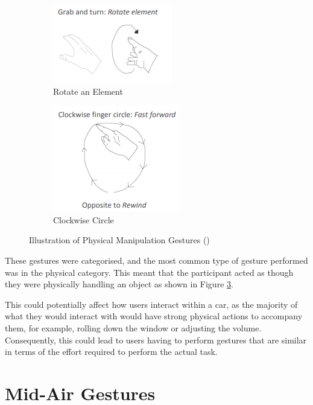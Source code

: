 \documentclass{l4proj}
\begin{document}
\begin{figure}[!htb]
    \centering
    \begin{subfigure}[b]{0.45\textwidth}
        \includegraphics{images/rotateElement.png}
        \caption{Rotate an Element}
        \label{fig:rotateElement}
    \end{subfigure}
    \begin{subfigure}[b]{0.45\textwidth}
        \includegraphics{images/clockwiseCircle.png}
        \caption{Clockwise Circle}
        \label{fig:clockwiseCircle}
    \end{subfigure}
    \caption{Illustration of Physical Manipulation Gestures (\cite{Jakobsen_2016})}
    \label{fig:gestureSet}
\end{figure}

These gestures were categorised, and the most common type of gesture performed was in the physical category. This meant that the participant acted as though they were physically handling an object as shown in Figure \ref{fig:gestureSet}. 

This could potentially affect how users interact within a car, as the majority of what they would interact with would have strong physical actions to accompany them, for example, rolling down the window or adjusting the volume. Consequently, this could lead to users having to perform gestures that are similar in terms of the effort required to perform the actual task.

\section{Mid-Air Gestures}
\end{document}
